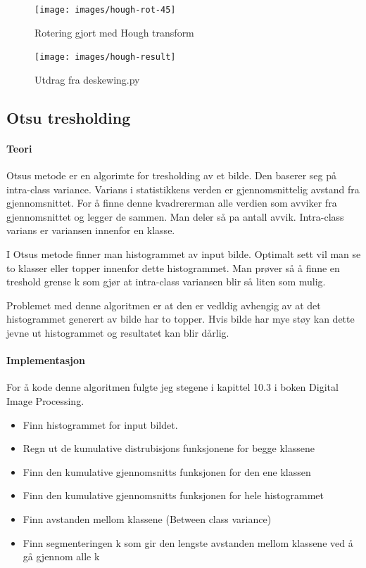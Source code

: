 \documentclass{article}
\begin{document}
\begin{figure}[h]
\centering
\texttt{[image: images/hough-rot-45]}
\caption{Rotering gjort med Hough transform}
\label{fig:hough-45}
\end{figure}


\begin{figure}[h]
\centering
\texttt{[image: images/hough-result]}
\caption{Utdrag fra deskewing.py}
\label{fig:hough-result}
\end{figure}


\subsection{Otsu tresholding}
\paragraph{Teori}
Otsus metode er en algorimte for tresholding av et bilde. Den baserer seg på intra-class variance. Varians i statistikkens verden er gjennomsnittelig avstand fra gjennomsnittet.
For å finne denne kvadrererman alle verdien som avviker fra gjennomsnittet og legger de sammen. Man deler så pa antall avvik. Intra-class varians er variansen innenfor en klasse.

I Otsus metode finner man histogrammet av input bilde. Optimalt sett vil man se to klasser eller topper innenfor dette histogrammet. Man prøver så å finne en treshold grense k som gjør at intra-class variansen blir så liten som mulig.

Problemet med denne algoritmen er at den er vedldig avhengig av at det histogrammet generert av bilde har to topper. Hvis bilde har mye støy kan dette jevne ut histogrammet og resultatet kan blir dårlig.

\paragraph{Implementasjon}
For å kode denne algoritmen fulgte jeg stegene i kapittel 10.3 i boken Digital Image Processing.
\begin{itemize}
\item Finn histogrammet for input bildet.
\item Regn ut de kumulative distrubisjons funksjonene for begge klassene
\item Finn den kumulative gjennomsnitts funksjonen for den ene klassen
\item Finn den kumulative gjennomsnitts funksjonen for hele histogrammet
\item Finn avstanden mellom klassene (Between class variance)
\item Finn segmenteringen k som gir den lengste avstanden mellom klassene ved å gå gjennom alle k
\end{itemize}
\end{document}

